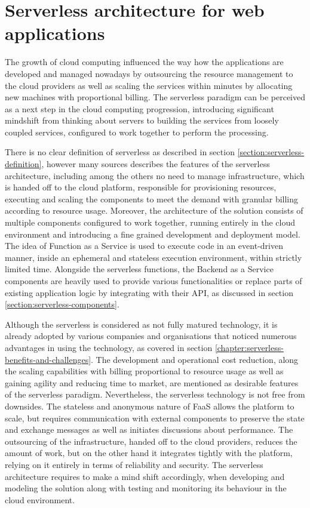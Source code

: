 \chapter{Serverless architecture for web applications}

The growth of cloud computing influenced the way how the applications are developed and managed nowadays by outsourcing the resource management to the cloud providers as well as scaling the services within minutes by allocating new machines with proportional billing. The serverless paradigm can be perceived as a next step in the cloud computing progression, introducing significant mindshift from thinking about servers to building the services from loosely coupled services, configured to work together to perform the processing.

There is no clear definition of serverless as described in section \ref{section:serverless-definition}, however many sources describes the features of the serverless architecture, including among the others no need to manage infrastructure, which is handed off to the cloud platform, responsible for provisioning resources, executing and scaling the components to meet the demand with granular billing according to resource usage. Moreover, the architecture of the solution consists of multiple components configured to work together, running entirely in the cloud environment and introducing a fine grained development and deployment model.
The idea of Function as a Service is used to execute code in an event-driven manner, inside an ephemeral and stateless execution environment, within strictly limited time. Alongside the serverless functions, the Backend as a Service components are heavily used to provide various functionalities or replace parts of existing application logic by integrating with their API, as discussed in section \ref{section:serverless-components}.

Although the serverless is considered as not fully matured technology, it is already adopted by various companies and organisations that noticed numerous advantages in using the technology, as covered in section \ref{chapter:serverless-benefits-and-challenges}.
The development and operational cost reduction, along the scaling capabilities with billing proportional to resource usage as well as gaining agility and reducing time to market, are mentioned as desirable features of the serverless paradigm.
Nevertheless, the serverless technology is not free from downsides. The stateless and anonymous nature of FaaS allows the platform to scale, but requires communication with external components to preserve the state and exchange messages as well as initiates discussions about performance. The outsourcing of the infrastructure, handed off to the cloud providers, reduces the amount of work, but on the other hand it integrates tightly with the platform, relying on it entirely in terms of reliability and security. The serverless architecture requires to make a mind shift accordingly, when developing and modeling the solution along with testing and monitoring its behaviour in the cloud environment.

